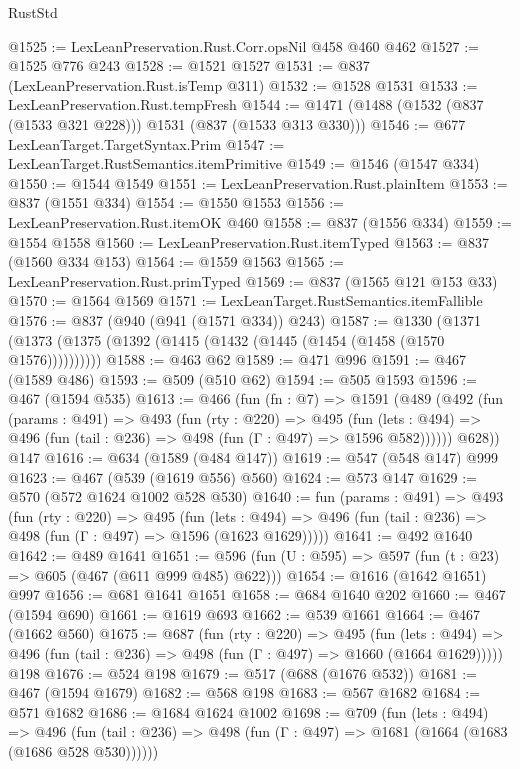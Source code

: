 \begin{lexlean}{RustStd}
\begin{coremodule}
@1525 := LexLeanPreservation.Rust.Corr.opsNil @458 @460 @462
@1527 := @1525 @776 @243
@1528 := @1521 @1527
@1531 := @837 (LexLeanPreservation.Rust.isTemp @311)
@1532 := @1528 @1531
@1533 := LexLeanPreservation.Rust.tempFresh
@1544 := @1471 (@1488 (@1532 (@837 (@1533 @321 @228))) @1531 (@837 (@1533 @313 @330)))
@1546 := @677 LexLeanTarget.TargetSyntax.Prim
@1547 := LexLeanTarget.RustSemantics.itemPrimitive
@1549 := @1546 (@1547 @334)
@1550 := @1544 @1549
@1551 := LexLeanPreservation.Rust.plainItem
@1553 := @837 (@1551 @334)
@1554 := @1550 @1553
@1556 := LexLeanPreservation.Rust.itemOK @460
@1558 := @837 (@1556 @334)
@1559 := @1554 @1558
@1560 := LexLeanPreservation.Rust.itemTyped
@1563 := @837 (@1560 @334 @153)
@1564 := @1559 @1563
@1565 := LexLeanPreservation.Rust.primTyped
@1569 := @837 (@1565 @121 @153 @33)
@1570 := @1564 @1569
@1571 := LexLeanTarget.RustSemantics.itemFallible
@1576 := @837 (@940 (@941 (@1571 @334)) @243)
@1587 := @1330 (@1371 (@1373 (@1375 (@1392 (@1415 (@1432 (@1445 (@1454 (@1458 (@1570 @1576))))))))))
@1588 := @463 @62
@1589 := @471 @996
@1591 := @467 (@1589 @486)
@1593 := @509 (@510 @62)
@1594 := @505 @1593
@1596 := @467 (@1594 @535)
@1613 := @466
    (fun (fn : @7) =>
    @1591
      (@489
        (@492
          (fun (params : @491) =>
          @493
            (fun (rty : @220) =>
            @495
              (fun (lets : @494) =>
              @496 (fun (tail : @236) => @498 (fun (Γ : @497) => @1596 @582))))))
        @628))
    @147
@1616 := @634 (@1589 (@484 @147))
@1619 := @547 (@548 @147) @999
@1623 := @467 (@539 (@1619 @556) @560)
@1624 := @573 @147
@1629 := @570 (@572 @1624 @1002 @528 @530)
@1640 := fun (params : @491) =>
  @493
    (fun (rty : @220) =>
    @495
      (fun (lets : @494) =>
      @496 (fun (tail : @236) => @498 (fun (Γ : @497) => @1596 (@1623 @1629)))))
@1641 := @492 @1640
@1642 := @489 @1641
@1651 := @596 (fun (U : @595) => @597 (fun (t : @23) => @605 (@467 (@611 @999 @485) @622)))
@1654 := @1616 (@1642 @1651) @997
@1656 := @681 @1641 @1651
@1658 := @684 @1640 @202
@1660 := @467 (@1594 @690)
@1661 := @1619 @693
@1662 := @539 @1661
@1664 := @467 (@1662 @560)
@1675 := @687
    (fun (rty : @220) =>
    @495
      (fun (lets : @494) =>
      @496 (fun (tail : @236) => @498 (fun (Γ : @497) => @1660 (@1664 @1629)))))
    @198
@1676 := @524 @198
@1679 := @517 (@688 (@1676 @532))
@1681 := @467 (@1594 @1679)
@1682 := @568 @198
@1683 := @567 @1682
@1684 := @571 @1682
@1686 := @1684 @1624 @1002
@1698 := @709
    (fun (lets : @494) =>
    @496 (fun (tail : @236) => @498 (fun (Γ : @497) => @1681 (@1664 (@1683 (@1686 @528 @530))))))

\end{coremodule}
\end{lexlean}
